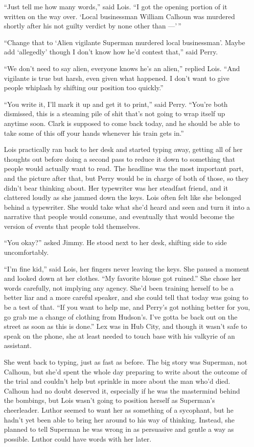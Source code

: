 ``Just tell me how many words,'' said Lois. ``I got the opening portion
of it written on the way over. `Local businessman William Calhoun was
murdered shortly after his not guilty verdict by none other than
---'\,''

``Change that to `Alien vigilante Superman murdered local businessman'.
Maybe add `allegedly' though I don't know how he'd contest that,'' said
Perry.

``We don't need to say alien, everyone knows he's an alien,'' replied
Lois. ``And vigilante is true but harsh, even given what happened. I
don't want to give people whiplash by shifting our position too
quickly.''

``You write it, I'll mark it up and get it to print,'' said Perry.
``You're both dismissed, this is a steaming pile of shit that's not
going to wrap itself up anytime soon. Clark is supposed to come back
today, and he should be able to take some of this off your hands
whenever his train gets in.''

Lois practically ran back to her desk and started typing away, getting
all of her thoughts out before doing a second pass to reduce it down to
something that people would actually want to read. The headline was the
most important part, and the picture after that, but Perry would be in
charge of both of those, so they didn't bear thinking about. Her
typewriter was her steadfast friend, and it clattered loudly as she
jammed down the keys. Lois often felt like she belonged behind a
typewriter. She would take what she'd heard and seen and turn it into a
narrative that people would consume, and eventually that would become
the version of events that people told themselves.

``You okay?'' asked Jimmy. He stood next to her desk, shifting side to
side uncomfortably.

``I'm fine kid,'' said Lois, her fingers never leaving the keys. She
paused a moment and looked down at her clothes. ``My favorite blouse got
ruined.'' She chose her words carefully, not implying any agency. She'd
been training herself to be a better liar and a more careful speaker,
and she could tell that today was going to be a test of that. ``If you
want to help me, and Perry's got nothing better for you, go grab me a
change of clothing from Hudson's. I've gotta be back out on the street
as soon as this is done.'' Lex was in Hub City, and though it wasn't
safe to speak on the phone, she at least needed to touch base with his
valkyrie of an assistant.

She went back to typing, just as fast as before. The big story was
Superman, not Calhoun, but she'd spent the whole day preparing to write
about the outcome of the trial and couldn't help but sprinkle in more
about the man who'd died. Calhoun had no doubt deserved it, especially
if he was the mastermind behind the bombings, but Lois wasn't going to
position herself as Superman's cheerleader. Luthor seemed to want her as
something of a sycophant, but he hadn't yet been able to bring her
around to his way of thinking. Instead, she planned to tell Superman he
was wrong in as persuasive and gentle a way as possible. Luthor could
have words with her later.

